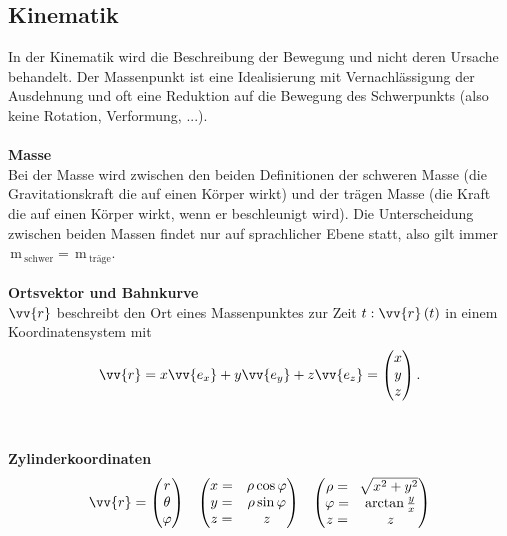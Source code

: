 \documentclass[a4paper,12pt]{article}
\numberwithin{equation}{section}
\begin{document}
\subsection{Kinematik}
In der Kinematik wird die Beschreibung der Bewegung und nicht deren Ursache behandelt. Der Massenpunkt ist eine Idealisierung mit Vernachlässigung der Ausdehnung und oft eine Reduktion auf die Bewegung des Schwerpunkts (also keine Rotation, Verformung, ...).
\\\hfill\\\textbf{Masse}\\ 
Bei der Masse wird zwischen den beiden Definitionen der schweren Masse (die Gravitationskraft die auf einen Körper wirkt) und der trägen Masse (die Kraft die auf einen Körper wirkt, wenn er beschleunigt wird). Die Unterscheidung zwischen beiden Massen findet nur auf sprachlicher Ebene statt, also gilt immer $\,\text{m}\,_{\text{schwer}}=\,\text{m}\,_{\text{träge}}$. 
\\\hfill\\\textbf{Ortsvektor und Bahnkurve}\\
$\vv{r}$ beschreibt den Ort eines Massenpunktes zur Zeit $t:\vv{r}\left(t\right)$ in einem Koordinatensystem mit
\[ 
        \vv{r}=x\vv{e_x}+y\vv{e_y}+z\vv{e_z}=\left(\begin{matrix}
                x\\y\\z
        \end{matrix}\right)
.\] 
\\\hfill\\\textbf{Zylinderkoordinaten}\\ 
\begin{align*}
        \vv{r}=\left(\begin{matrix}
                r\\\theta \\\varphi 
                \end{matrix}\right)&&\left(\begin{matrix}
                x=&\rho \cos \varphi\\
                y=&\rho \sin \varphi\\
                z=&z
                \end{matrix}\right)&&\left(\begin{matrix}
                \rho =&\sqrt[]{x^2+y^2}\\
                \varphi=&\arctan \tfrac{y}{x}\\
                z=&z
                \end{matrix}\right)
\end{align*}
\end{document}
